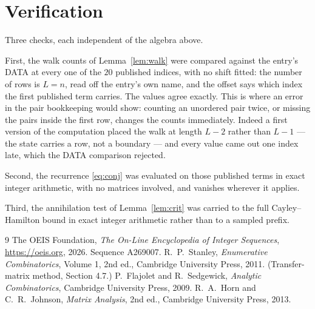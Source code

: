 \documentclass[11pt,a4paper]{article}
\theoremstyle{plain}
\theoremstyle{definition}
\begin{document}
\section{Verification}

Three checks, each independent of the algebra above.

First, the walk counts of Lemma~\ref{lem:walk} were compared against the entry's DATA at
every one of the $20$ published indices, with no shift fitted: the number of rows is
$L=n$, read off the entry's own name, and the offset says which index the first
published term carries. The values agree exactly. This is where an error in the pair
bookkeeping would show: counting an unordered pair twice, or missing the pairs inside the
first row, changes the counts immediately. Indeed a first version of the computation
placed the walk at length $L-2$ rather than $L-1$ --- the state carries a row, not a
boundary --- and every value came out one index late, which the DATA comparison rejected.

Second, the recurrence \eqref{eq:conj} was evaluated on those published terms in exact
integer arithmetic, with no matrices involved, and vanishes wherever it applies.

Third, the annihilation test of Lemma~\ref{lem:crit} was carried to the full
Cayley--Hamilton bound in exact integer arithmetic rather than to a sampled prefix.

\begin{thebibliography}{9}
 The OEIS Foundation, \emph{The On-Line Encyclopedia of Integer
Sequences}, \url{https://oeis.org}, 2026. Sequence A269007.
 R.~P.~Stanley, \emph{Enumerative Combinatorics}, Volume 1, 2nd ed.,
Cambridge University Press, 2011. (Transfer-matrix method, Section 4.7.)
 P.~Flajolet and R.~Sedgewick, \emph{Analytic Combinatorics}, Cambridge
University Press, 2009.
 R.~A.~Horn and C.~R.~Johnson, \emph{Matrix Analysis}, 2nd ed., Cambridge
University Press, 2013.
\end{thebibliography}
\end{document}
